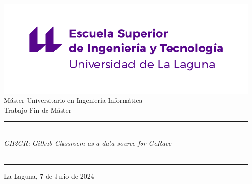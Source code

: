\pagestyle{empty}
\thispagestyle{empty}


\newcommand{\HRule}{\rule{\linewidth}{1mm}}
\setlength{\parindent}{0mm}
\setlength{\parskip}{0mm}




\begin{center}
\includegraphics[scale=0.8]{images/escuela-ingenieria-tecnologia-original}\\[10mm]
{\Large Máster Universitario en Ingeniería Informática}
\\[5mm]
{\Large Trabajo Fin de Máster}
\end{center}

\HRule
\begin{flushright}
        {\Huge \tfgTitle } \\[2.5mm]
        {\Large \textit{GH2GR: Github Classroom as a data source for GoRace}} \\[5mm]
        {\Large \tfgStudentName} \\[5mm]
\end{flushright}
\HRule
{}
\begin{center}
  \Large La Laguna, 7 de Julio de 2024
\end{center}